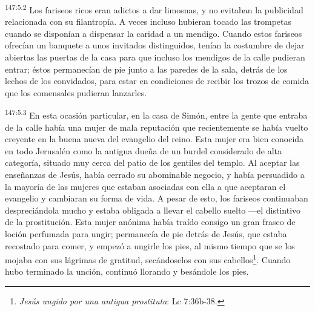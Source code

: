 \par
\textsuperscript{147:5.2} Los fariseos ricos eran adictos a dar limosnas, y no evitaban la publicidad relacionada con su filantropía. A veces incluso hubieran tocado las trompetas cuando se disponían a dispensar la caridad a un mendigo. Cuando estos fariseos ofrecían un banquete a unos invitados distinguidos, tenían la costumbre de dejar abiertas las puertas de la casa para que incluso los mendigos de la calle pudieran entrar; éstos permanecían de pie junto a las paredes de la sala, detrás de los lechos de los convidados, para estar en condiciones de recibir los trozos de comida que los comensales pudieran lanzarles.

\par
\textsuperscript{147:5.3} En esta ocasión particular, en la casa de Simón, entre la gente que entraba de la calle había una mujer de mala reputación que recientemente se había vuelto creyente en la buena nueva del evangelio del reino. Esta mujer era bien conocida en todo Jerusalén como la antigua dueña de un burdel considerado de alta categoría, situado muy cerca del patio de los gentiles del templo. Al aceptar las enseñanzas de Jesús, había cerrado su abominable negocio, y había persuadido a la mayoría de las mujeres que estaban asociadas con ella a que aceptaran el evangelio y cambiaran su forma de vida. A pesar de esto, los fariseos continuaban despreciándola mucho y estaba obligada a llevar el cabello suelto ---el distintivo de la prostitución. Esta mujer anónima había traído consigo un gran frasco de loción perfumada para ungir; permanecía de pie detrás de Jesús, que estaba recostado para comer, y empezó a ungirle los pies, al mismo tiempo que se los mojaba con sus lágrimas de gratitud, secándoselos con sus cabellos\footnote{\textit{Jesús ungido por una antigua prostituta}: Lc 7:36b-38.}. Cuando hubo terminado la unción, continuó llorando y besándole los pies.

